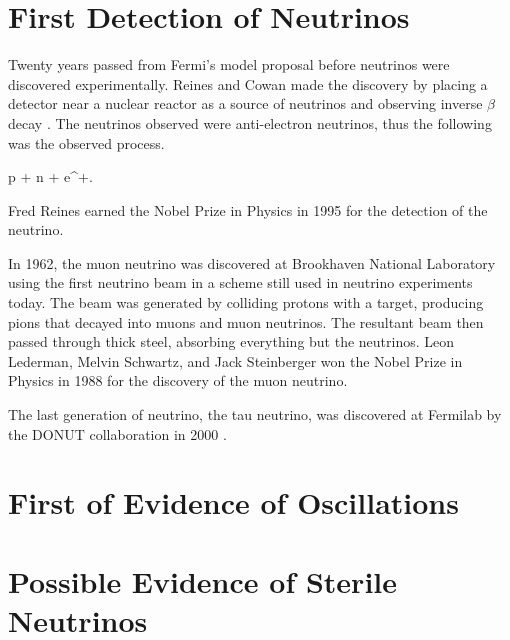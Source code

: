 \section{First Detection of Neutrinos}

Twenty years passed from Fermi's model proposal before neutrinos were discovered experimentally. Reines and Cowan made the discovery by placing a detector near a nuclear reactor as a source of neutrinos and observing inverse $\beta$ decay \cite{ref:1953, ref:1956}. The neutrinos observed were anti-electron neutrinos, thus the following was the observed process.

\beq
p +  \rightarrow n + e^{+}.
\label{eq:BetaInv}
\eeq

\n Fred Reines earned the Nobel Prize in Physics in 1995 for the detection of the neutrino.

In 1962, the muon neutrino was discovered at Brookhaven National Laboratory using the first neutrino beam \cite{ref:BNL} in a scheme still used in neutrino experiments today. The beam was generated by colliding protons with a target, producing pions that decayed into muons and muon neutrinos. The resultant beam then passed through thick steel, absorbing everything but the neutrinos. Leon Lederman, Melvin Schwartz, and Jack Steinberger won the Nobel Prize in Physics in 1988 for the discovery of the muon neutrino.

The last generation of neutrino, the tau neutrino, was discovered at Fermilab by the DONUT collaboration in 2000 \cite{ref:DONUT}.

\section{First of Evidence of Oscillations}

\section{Possible Evidence of Sterile Neutrinos}




